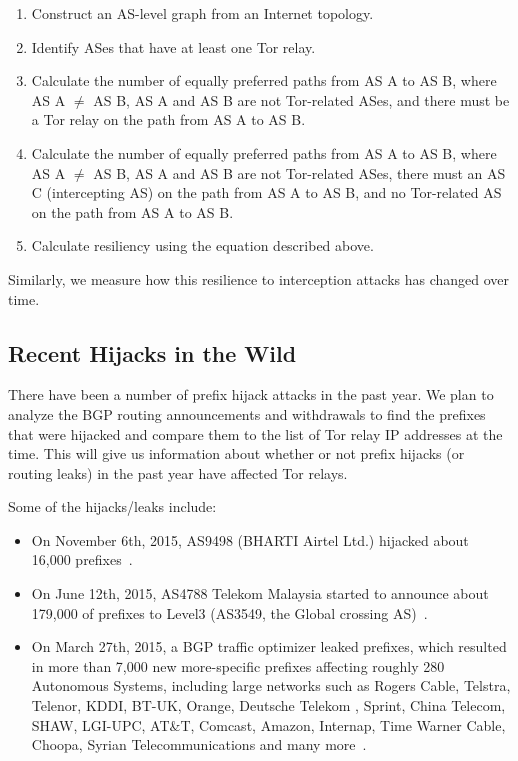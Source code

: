 \begin{enumerate}
\item Construct an AS-level graph from an Internet topology.
\item Identify ASes that have at least one Tor relay.
\item Calculate the number of equally preferred paths from AS A to AS B, where AS A $\neq$ AS B, AS A and AS B are not Tor-related ASes, and there must be a Tor relay on the path from AS A to AS B.
\item Calculate the number of equally preferred paths from AS A to AS B, where AS A $\neq$ AS B, AS A and AS B are not Tor-related ASes, there must an AS C (intercepting AS) on the path from AS A to AS B, and no Tor-related AS on the path from AS A to AS B.
\item Calculate resiliency using the equation described above.
\end{enumerate}

Similarly, we measure how this resilience to interception attacks has changed over time.

\subsection{Recent Hijacks in the Wild}

There have been a number of prefix hijack attacks in the past year.  We plan to analyze the BGP routing announcements and withdrawals to find the prefixes that were hijacked and compare them to the list of Tor relay IP addresses at the time.  This will give us information about whether or not prefix hijacks (or routing leaks) in the past year have affected Tor relays.

Some of the hijacks/leaks include: 

\begin{itemize}
\item On November 6th, 2015, AS9498 (BHARTI Airtel Ltd.) hijacked about 16,000 prefixes~\cite{indiahijack}.
\item On June 12th, 2015, AS4788 Telekom Malaysia started to announce about 179,000 of prefixes to Level3 (AS3549, the Global crossing AS)~\cite{malaysialeak}.
\item On March 27th, 2015, a BGP traffic optimizer leaked prefixes, which resulted in more than 7,000 new more-specific prefixes affecting roughly 280 Autonomous Systems, including large networks such as Rogers Cable, Telstra, Telenor, KDDI, BT-UK, Orange, Deutsche Telekom , Sprint, China Telecom, SHAW, LGI-UPC, AT\&T, Comcast, Amazon, Internap, Time Warner Cable, Choopa, Syrian Telecommunications and many more~\cite{bgpoptimizer}.
\end{itemize}


